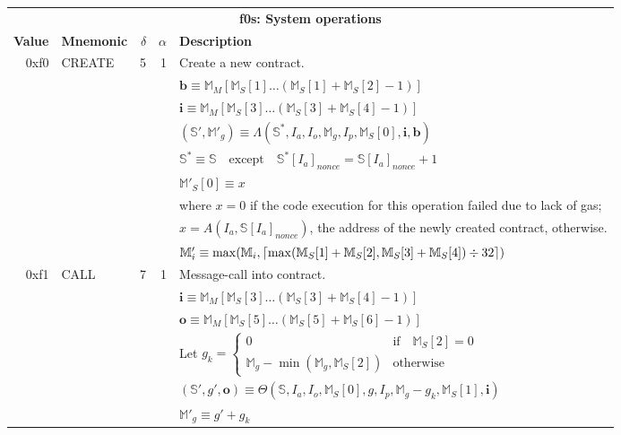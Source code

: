 \documentclass[9pt,oneside]{amsart}
\DeclarePairedDelimiter{\ceil}{\lceil}{\rceil}
\begin{document}
\begin{tabular*}{\columnwidth}[h]{rlrrl}
\toprule
\multicolumn{5}{c}{\textbf{f0s: System operations}} \vspace{5pt} \\
\textbf{Value} & \textbf{Mnemonic} & $\delta$ & $\alpha$ & \textbf{Description} \vspace{5pt} \\
0xf0 & {\small CREATE} & 5 & 1 & Create a new contract. \\
&&&& $\mathbf{b} \equiv \mathbb{M}_M[ \mathbb{M}_S[1] \dots (\mathbb{M}_S[1] + \mathbb{M}_S[2] - 1) ]$ \\
&&&& $\mathbf{i} \equiv \mathbb{M}_M[ \mathbb{M}_S[3] \dots (\mathbb{M}_S[3] + \mathbb{M}_S[4] - 1) ]$ \\
&&&& $(\mathbb{S}', \mathbb{M}'_g) \equiv \Lambda(\mathbb{S}^*, I_a, I_o, \mathbb{M}_g, I_p, \mathbb{M}_S[0], \mathbf{i}, \mathbf{b})$ \\
&&&& $\mathbb{S}^* \equiv \mathbb{S} \quad \text{except} \quad \mathbb{S}^*[I_a]_{nonce} = \mathbb{S}[I_a]_{nonce} + 1$ \\
&&&& $\mathbb{M}'_S[0] \equiv x$ \\
&&&& where $x=0$ if the code execution for this operation failed due to lack of gas;\\
&&&& $x=A(I_a, \mathbb{S}[I_a]_{nonce})$, the address of the newly created contract, otherwise. \\
&&&& $\mathbb{M}'_i \equiv \max(\mathbb{M}_i, \ceil{ \max(\mathbb{M}_S[1] + \mathbb{M}_S[2], \mathbb{M}_S[3] + \mathbb{M}_S[4]) \div 32 })$ \\
\midrule
0xf1 & {\small CALL} & 7 & 1 & Message-call into contract. \\
&&&& $\mathbf{i} \equiv \mathbb{M}_M[ \mathbb{M}_S[3] \dots (\mathbb{M}_S[3] + \mathbb{M}_S[4] - 1) ]$ \\
&&&& $\mathbf{o} \equiv \mathbb{M}_M[ \mathbb{M}_S[5] \dots (\mathbb{M}_S[5] + \mathbb{M}_S[6] - 1) ]$ \\
&&&& Let $g_k = \begin{cases}0 & \text{if} \quad \mathbb{M}_S[2] = 0 \\ \mathbb{M}_g - \min(\mathbb{M}_g, \mathbb{M}_S[2]) & \text{otherwise} \end{cases}$ \\
&&&& $(\mathbb{S}', g', \mathbf{o}) \equiv \Theta(\mathbb{S}, I_a, I_o, \mathbb{M}_S[0], g, I_p, \mathbb{M}_g - g_k, \mathbb{M}_S[1], \mathbf{i})$ \\
&&&& $\mathbb{M}'_g \equiv g' + g_k$ \\

\end{tabular*}
\end{document}
